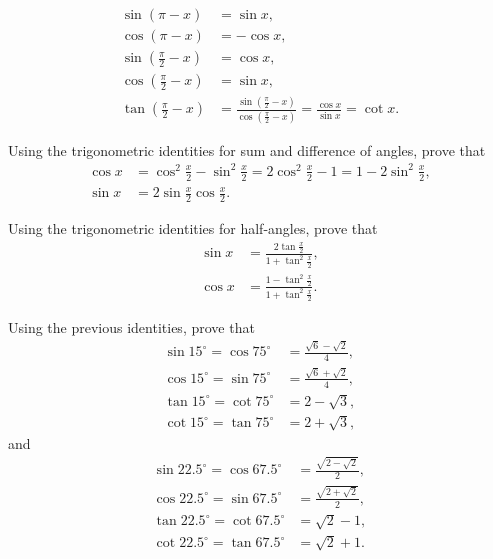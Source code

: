 \begin{identity}
\begin{align}
    \sin(\pi - x) &= \sin x, \label{id:sin(pi-x)}\\
    \cos (\pi -x) &= - \cos x, \label{id:cos(pi-x)}\\
    \sin\left(\frac{\pi}{2} - x\right) &= \cos x, \label{id:sin(pi/2-x)}\\
    \cos\left(\frac{\pi}{2} - x\right) &= \sin x, \label{id:cos(pi/2-x)}\\
    \tan \left(\frac{\pi}{2} - x \right) &= \frac{\sin\left(\frac{\pi}{2} - x\right)}{ \cos\left(\frac{\pi}{2} - x\right)} = \frac{\cos x}{\sin x} = \cot x. \label{id:tan(pi/2-x)}
\end{align}
\end{identity}


\begin{identity}
Using the trigonometric identities for sum and difference of angles, prove that
\begin{align}
    \cos x &= \cos^2\frac x2 - \sin^2 \frac x2 = 2 \cos^2 \frac x2 - 1 = 1 - 2 \sin^2 \frac x2, \label{cos-half-angle}\\
    \sin x &= 2 \sin \frac x2 \cos \frac x2. \label{sin-half-angle}
\end{align}
\end{identity}


\begin{identity}[$\tan(x/2)$]
Using the trigonometric identities for half-angles, prove that
\begin{align}
    \sin x &= \frac{\displaystyle 2 \tan \frac{x}{2}}{\displaystyle 1 + \tan^2 \frac{x}{2}},\\
    \cos x &= \frac{\displaystyle 1 - \tan^2 \frac{x}{2}}{\displaystyle 1 + \tan^2 \frac{x}{2}}.
\end{align}
\end{identity}

    \begin{question}
    Using the previous identities, prove that
    \begin{align*}
        \sin 15^{\circ}  = \cos 75^{\circ} &= \frac{\sqrt 6 - \sqrt 2}{4},\\
        \cos 15^{\circ}  = \sin 75^{\circ}  &= \frac{\sqrt 6 + \sqrt 2}{4},\\
        \tan 15^{\circ} = \cot 75^{\circ} &= 2 - \sqrt 3,\\
        \cot 15^{\circ} = \tan 75^{\circ} &= 2 + \sqrt 3,
    \end{align*}
    and
    \begin{align*}
        \sin 22.5^{\circ}  = \cos 67.5^{\circ} &= \frac{\sqrt{2-\sqrt 2}}{2},\\
        \cos 22.5^{\circ}  = \sin 67.5^{\circ} &= \frac{\sqrt{2+\sqrt 2}}{2},\\
        \tan 22.5^{\circ} = \cot 67.5^{\circ} &= \sqrt 2 - 1,\\
        \cot 22.5^{\circ} = \tan 67.5^{\circ} &= \sqrt 2 + 1.
    \end{align*}
\end{question}

